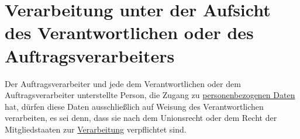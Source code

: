 \chapter{Verarbeitung unter der Aufsicht des Verantwortlichen oder des Auftragsverarbeiters}
\label{ch:29}


Der Auftragsverarbeiter und jede dem Verantwortlichen oder dem Auftragsverarbeiter unterstellte Person, die Zugang zu
\hyperref[itm:04-1]{personenbezogenen Daten} hat, dürfen diese Daten ausschließlich auf Weisung des Verantwortlichen verarbeiten, es sei
denn, dass sie nach dem Unionsrecht oder dem Recht der Mitgliedstaaten zur \hyperref[itm:04-2]{Verarbeitung} verpflichtet sind.


